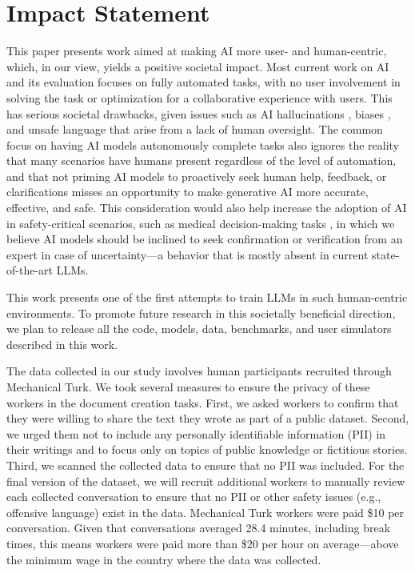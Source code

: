 
\section*{Impact Statement}

This paper presents work aimed at making AI more user- and human-centric, which, in our view, yields a positive societal impact. Most current work on AI and its evaluation focuses on fully automated tasks, with no user involvement in solving the task or optimization for a collaborative experience with users. This has serious societal drawbacks, given issues such as AI hallucinations \cite{Huang:2025}, biases \cite{Gallegos:2024}, and unsafe language \cite{Shi:2024} that arise from a lack of human oversight. The common focus on having AI models autonomously complete tasks also ignores the reality that many scenarios have humans present regardless of the level of automation, and that not priming AI models to proactively seek human help, feedback, or clarifications misses an opportunity to make generative AI more accurate, effective, and safe.
This consideration would also help increase the adoption of AI in safety-critical scenarios, such as medical decision-making tasks \cite{Liu:2024}, in which we believe AI models should be inclined to seek confirmation or verification \cite{Gero:2023} from an expert in case of uncertainty---a behavior that is mostly absent in current state-of-the-art LLMs.

This work presents one of the first attempts to train LLMs in such human-centric environments. To promote future research in this societally beneficial direction, we plan to release all the code, models, data, benchmarks, and user simulators described in this work.

The data collected in our study involves human participants recruited through Mechanical Turk. We took several measures to ensure the privacy of these workers in the document creation tasks. First, we asked workers to confirm that they were willing to share the text they wrote as part of a public dataset. Second, we urged them not to include any personally identifiable information (PII) in their writings and to focus only on topics of public knowledge or fictitious stories. Third, we scanned the collected data to ensure that no PII was included. For the final version of the dataset, we will recruit additional workers to manually review each collected conversation to ensure that no PII or other safety issues (e.g., offensive language) exist in the data.
Mechanical Turk workers were paid \$10 per conversation. Given that conversations averaged 28.4 minutes, including break times, this means workers were paid more than \$20 per hour on average—above the minimum wage in the country where the data was collected.
